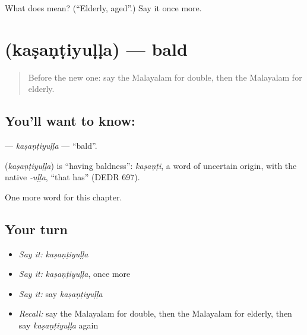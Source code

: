 \begin{tcolorbox}[breakable,colback=teal!4,colframe=teal!35!black,title={Before you move on}]
What does  mean? (\textquotedblleft{}Elderly, aged\textquotedblright{}.) Say it once more.
\end{tcolorbox}
\section[\texorpdfstring{\ml{കഷണ്ടിയുള്ള} (kaṣaṇṭiyuḷḷa)}{കഷണ്ടിയുള്ള (kaṣaṇṭiyuḷḷa)}]{ (kaṣaṇṭiyuḷḷa) — bald}

\label{lesson:ML-C247-kasantiyulla}



\begin{quote}
Before the new one: say the Malayalam for double, then the Malayalam for elderly.
\end{quote}

\subsection*{You'll want to know: }
\textbf{} — \emph{kaṣaṇṭiyuḷḷa} — \textquotedblleft{}bald\textquotedblright{}.

\begin{cousinweb}
\textbf{} (\emph{kaṣaṇṭiyuḷḷa}) is \textquotedblleft{}having baldness\textquotedblright{}: \emph{kaṣaṇṭi}, a word of uncertain origin, with the native \emph{-uḷḷa}, \textquotedblleft{}that has\textquotedblright{} (DEDR 697).
\end{cousinweb}

\begin{grammarlens}[title={What you've built}]
One more word for this chapter.
\end{grammarlens}

\subsection*{Your turn}
\begin{itemize}
\raggedright
  \item \emph{Say it:} \emph{kaṣaṇṭiyuḷḷa}
  \item \emph{Say it:} \emph{kaṣaṇṭiyuḷḷa}, once more
  \item \emph{Say it:} say \emph{kaṣaṇṭiyuḷḷa}
  \item \emph{Recall:} say the Malayalam for double, then the Malayalam for elderly, then say \emph{kaṣaṇṭiyuḷḷa} again
\end{itemize}

